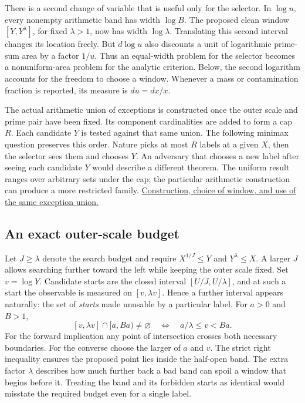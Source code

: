\documentclass[12pt,letterpaper]{article}
\begin{document}
There is a second change of variable that is useful only for the selector. In \(\log u\), every nonempty arithmetic band has width \(\log B\). The proposed clean window \([Y,Y^\lambda]\), for fixed \(\lambda>1\), now has width \(\log\lambda\). Translating this second interval changes its location freely. But \(d\log u\) also discounts a unit of logarithmic prime-sum area by a factor \(1/u\). Thus an equal-width problem for the selector becomes a nonuniform-area problem for the analytic criterion. Below, the second logarithm accounts for the freedom to choose a window. Whenever a mass or contamination fraction is reported, its measure is \(du=dx/x\).

The actual arithmetic union of exceptions is constructed once the outer scale and prime pair have been fixed. Its component cardinalities are added to form a cap \(R\). Each candidate \(Y\) is tested against that same union. The following minimax question preserves this order. Nature picks at most \(R\) labels at a given \(X\), then the selector sees them and chooses \(Y\). An adversary that chooses a new label after seeing each candidate \(Y\) would describe a different theorem. The uniform result ranges over arbitrary sets under the cap; the particular arithmetic construction can produce a more restricted family. \href{https://github.com/nousentllc/riemann-hypothesis/blob/40e56bab026552e089d7afcfeff08d2defb9c005/src/Development/AutomorphicArithmetic/AutomorphicVarieties/LayeredIsomorphisms/ThmBabOf.lean#L75-L98}{Construction, choice of window, and use of the same exception union.}

\subsection{An exact outer-scale budget}
Let \(J\ge\lambda\) denote the search budget and require \(X^{1/J}\le Y\) and \(Y^\lambda\le X\). A larger \(J\) allows searching further toward the left while keeping the outer scale fixed. Set \(v=\log Y\). Candidate starts are the closed interval \([U/J,U/\lambda]\), and at such a start the observable is measured on \([v,\lambda v]\). Hence a further interval appears naturally: the set of \emph{starts} made unusable by a particular label. For \(a>0\) and \(B>1\),
\[
 [v,\lambda v]\cap[a,Ba)\ne\varnothing
      \quad\Longleftrightarrow\quad a/\lambda\le v<Ba .
\]
For the forward implication any point of intersection crosses both necessary boundaries. For the converse choose the larger of \(a\) and \(v\). The strict right inequality ensures the proposed point lies inside the half-open band. The extra factor \(\lambda\) describes how much further back a bad band can spoil a window that begins before it. Treating the band and its forbidden starts as identical would misstate the required budget even for a single label.
\end{document}
